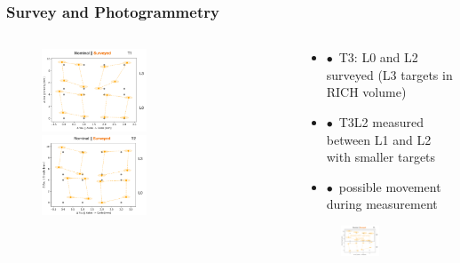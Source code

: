 \documentclass[aspectratio=1610, 12pt, xcolor=dvipsnames]{beamer}
\begin{document}
\begin{frame}\frametitle{Survey and Photogrammetry}
  \begin{columns}
    \begin{column}[c]{0.48\textwidth}
      \begin{figure}
        \includegraphics[width=0.5\textwidth]{plots/survey_T1.png}
        \includegraphics[width=0.5\textwidth]{plots/survey_T2.png}
      \end{figure}
    \end{column}
    \begin{column}[c]{0.48\textwidth}
      \begin{itemize}
        \item $\bullet$\, T3: L0 and L2 surveyed (L3 targets in RICH volume)
        \item $\bullet$\, T3L2 measured between L1 and L2 with smaller targets
        \item $\bullet$\, possible movement during measurement
      \end{itemize}
      \begin{figure}
        \includegraphics[width=0.5\textwidth]{plots/survey_T3.png}
      \end{figure}
    \end{column}
  \end{columns}
\end{frame}
\end{document}
